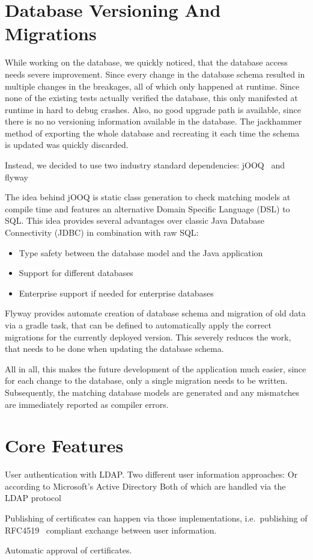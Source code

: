 \section{Database Versioning And Migrations}\label{sec:databaseVersioningAndMigrations}
While working on the database, we quickly noticed, that the database access needs severe improvement.
Since every change in the database schema resulted in multiple changes in the breakages, all of which only happened at
runtime.
Since none of the existing tests actually verified the database, this only manifested at runtime in hard to debug
crashes.
Also, no good upgrade path is available, since there is no no versioning information available in the database.
The jackhammer method of exporting the whole database and recreating it each time the schema is updated was quickly
discarded.

Instead, we decided to use two industry standard dependencies: jOOQ~\cite{jooq} and flyway~\cite{flyway}

The idea behind jOOQ is static class generation to check matching models at compile time and features an alternative
Domain Specific Language (DSL) to SQL\@.
This idea provides several advantages over classic Java Database Connectivity (JDBC) in combination with raw SQL:
\begin{itemize}
    \item Type safety between the database model and the Java application
    \item Support for different databases
    \item Enterprise support if needed for enterprise databases
\end{itemize}

Flyway provides automate creation of database schema and migration of old data via a gradle task, that can be defined to
automatically apply the correct migrations for the currently deployed version.
This severely reduces the work, that needs to be done when updating the database schema.

All in all, this makes the future development of the application much easier, since for each change to the database,
only a single migration needs to be written.
Subsequently, the matching database models are generated and any mismatches are immediately reported as compiler errors.

\section{Core Features}\label{sec:coreFeatures}
User authentication with LDAP. %
Two different user information approaches:
Or according to Microsoft's Active Directory
Both of which are handled via the LDAP protocol

Publishing of certificates can happen via those implementations, i.e.\ publishing of RFC4519~\cite{RFC4519} compliant
exchange between user information.

Automatic approval of certificates.
